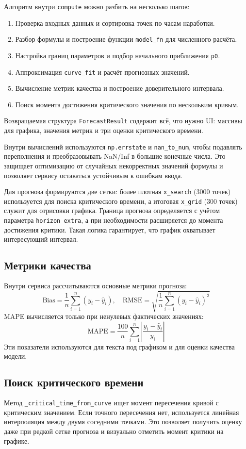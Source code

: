 \documentclass[12pt,a4paper]{article}
\begin{document}
Алгоритм внутри \texttt{compute} можно разбить на несколько шагов:
\begin{enumerate}
  \item Проверка входных данных и сортировка точек по часам наработки.
  \item Разбор формулы и построение функции \texttt{model\_fn} для численного расчёта.
  \item Настройка границ параметров и подбор начального приближения \texttt{p0}.
  \item Аппроксимация \texttt{curve\_fit} и расчёт прогнозных значений.
  \item Вычисление метрик качества и построение доверительного интервала.
  \item Поиск момента достижения критического значения по нескольким кривым.
\end{enumerate}
Возвращаемая структура \texttt{ForecastResult} содержит всё, что нужно UI:
массивы для графика, значения метрик и три оценки критического времени.

Внутри вычислений используются \texttt{np.errstate} и \texttt{nan\_to\_num},
чтобы подавлять переполнения и преобразовывать NaN/Inf в большие конечные числа.
Это защищает оптимизацию от случайных некорректных значений формулы и
позволяет сервису оставаться устойчивым к ошибкам ввода.

Для прогноза формируются две сетки: более плотная \texttt{x\_search} (3000 точек)
используется для поиска критического времени, а итоговая \texttt{x\_grid} (300 точек)
служит для отрисовки графика. Граница прогноза определяется с учётом
параметра \texttt{horizon\_extra}, а при необходимости расширяется до момента
достижения критики. Такая логика гарантирует, что график охватывает интересующий интервал.

\subsection*{Метрики качества}
Внутри сервиса рассчитываются основные метрики прогноза:
\[
\text{Bias} = \frac{1}{n}\sum_{i=1}^{n}(y_i - \hat{y}_i),
\quad
\text{RMSE} = \sqrt{\frac{1}{n}\sum_{i=1}^{n}(y_i - \hat{y}_i)^2}
\]
MAPE вычисляется только при ненулевых фактических значениях:
\[
\text{MAPE} = \frac{100}{n}\sum_{i=1}^{n}\left|\frac{y_i - \hat{y}_i}{y_i}\right|
\]
Эти показатели используются для текста под графиком и для оценки качества модели.

\subsection*{Поиск критического времени}
Метод \texttt{\_critical\_time\_from\_curve} ищет момент пересечения кривой
с критическим значением. Если точного пересечения нет, используется линейная
интерполяция между двумя соседними точками. Это позволяет получить оценку даже
при редкой сетке прогноза и визуально отметить момент критики на графике.
\end{document}
